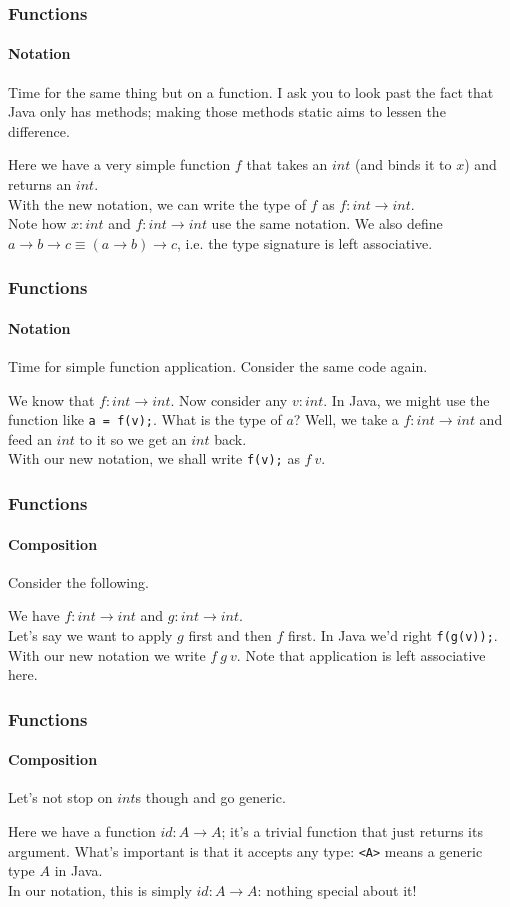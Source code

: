 \documentclass{beamer}
\begin{document}
\begin{frame}
  \frametitle{Functions}
  \framesubtitle{Notation}
  Time for the same thing but on a function. I ask you to look past
  the fact that Java only has methods; making those methods static
  aims to lessen the difference.
  \pause
  
  \pause
  Here we have a very simple function $f$ that takes an $int$ (and binds it to
  $x$) and returns an $int$.\\
  \pause
  With the new notation, we can write the type of $f$ as $f:int
  \rightarrow int$.\\
  \pause
  Note how $x:int$ and $f:int \rightarrow int$ use the same notation.
  \pause
  We also define $a \rightarrow b \rightarrow c \equiv (a
  \rightarrow b) \rightarrow c$, i.e. the type signature is left associative.
\end{frame}
\begin{frame}
  \frametitle{Functions}
  \framesubtitle{Notation}
  Time for simple function application. Consider the same code again.
  \pause
  
  \pause
  We know that $f:int \rightarrow int$. Now consider any $v:int$. In
  Java, we might use the function like \lstinline|a = f(v);|. What is
  the type of $a$? Well, we take a $f:int \rightarrow int$ and feed an
  $int$ to it so we get an $int$ back.\\
  \pause
  With our new notation, we shall write \lstinline|f(v);| as $f\:v$.\\

\end{frame}
\begin{frame}
  \frametitle{Functions}
  \framesubtitle{Composition}
  Consider the following.
  
  \pause
  We have $f:int \rightarrow int$ and $g:int \rightarrow int$.\\
  Let's say we want to apply $g$ first and then $f$ first. In Java
  we'd right \lstinline|f(g(v));|. With our new notation we write
  $f\:g\:v$. Note that application is left associative here.\\
\end{frame}
\begin{frame}
  \frametitle{Functions}
  \framesubtitle{Composition}
  Let's not stop on $int$s though and go generic.
  
  \pause
  Here we have a function $id:A \rightarrow A$; it's a trivial
  function that just returns its argument. What's important is that
  it accepts any type: \lstinline|<A>| means a generic type $A$ in
  Java.\\
  \pause
  In our notation, this is simply $id:A \rightarrow A$: nothing
  special about it!
\end{frame}
\end{document}
